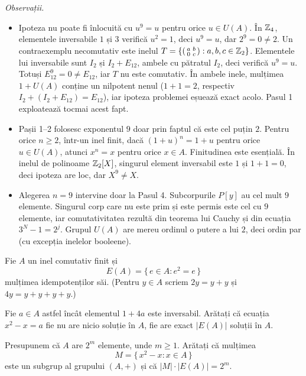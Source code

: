 \begin{solutie}
\smallskip
\textit{Observații.}
\begin{itemize}[nosep,leftmargin=1.4em]
  \item Ipoteza nu poate fi înlocuită cu $u^{9}=u$ pentru orice $u\in U(A)$. În $\mathbb{Z}_4$, elementele inversabile $1$ și $3$ verifică $u^{2}=1$, deci $u^{9}=u$, dar $2^{9}=0\neq 2$. Un contraexemplu necomutativ este inelul $T=\left\{\begin{psmallmatrix}a&b\\0&c\end{psmallmatrix} : a,b,c\in\mathbb{Z}_2\right\}$. Elementele lui inversabile sunt $I_2$ și $I_2+E_{12}$, ambele cu pătratul $I_2$, deci verifică $u^{9}=u$. Totuși $E_{12}^{9}=0\neq E_{12}$, iar $T$ nu este comutativ. În ambele inele, mulțimea $1+U(A)$ conține un nilpotent nenul ($1+1=2$, respectiv $I_2+(I_2+E_{12})=E_{12}$), iar ipoteza problemei eșuează exact acolo. Pasul 1 exploatează tocmai acest fapt.
  \item Pașii 1--2 folosesc exponentul $9$ doar prin faptul că este cel puțin $2$. Pentru orice $n\ge 2$, într-un inel finit, dacă $(1+u)^{n}=1+u$ pentru orice $u\in U(A)$, atunci $x^{n}=x$ pentru orice $x\in A$. Finitudinea este esențială. În inelul de polinoame $\mathbb{Z}_2[X]$, singurul element inversabil este $1$ și $1+1=0$, deci ipoteza are loc, dar $X^{9}\neq X$.
  \item Alegerea $n=9$ intervine doar la Pasul 4. Subcorpurile $P[y]$ au cel mult $9$ elemente. Singurul corp care nu este prim și este permis este cel cu $9$ elemente, iar comutativitatea rezultă din teorema lui Cauchy și din ecuația $3^{N}-1=2^{j}$. Grupul $U(A)$ are mereu ordinul o putere a lui $2$, deci ordin par (cu excepția inelelor booleene).
\end{itemize}
\end{solutie}

\begin{problema}
Fie $A$ un inel comutativ finit și
\[
  E(A)=\{\,e\in A : e^{2}=e\,\}
\]
mulțimea idempotenților săi. (Pentru $y\in A$ scriem $2y=y+y$ și $4y=y+y+y+y$.)
\begin{parti}
\item Fie $a\in A$ astfel încât elementul $1+4a$ este inversabil. Arătați că
  ecuația $x^{2}-x=a$ fie nu are nicio soluție în $A$, fie are exact $|E(A)|$
  soluții în $A$.
\item Presupunem că $A$ are $2^{m}$ elemente, unde $m\ge1$. Arătați că mulțimea
  \[
    M=\{\,x^{2}-x : x\in A\,\}
  \]
  este un subgrup al grupului $(A,+)$ și că $|M|\cdot|E(A)|=2^{m}$.
\end{parti}
\end{problema}

